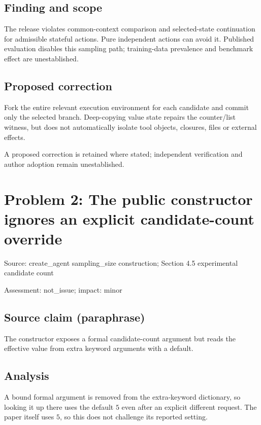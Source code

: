 \documentclass[11pt]{article}
\begin{document}
\subsection*{Finding and scope}

The release violates common-context comparison and selected-state continuation for admissible stateful actions. Pure independent actions can avoid it. Published evaluation disables this sampling path; training-data prevalence and benchmark effect are unestablished.

\subsection*{Proposed correction}

Fork the entire relevant execution environment for each candidate and commit only the selected branch. Deep-copying value state repairs the counter/list witness, but does not automatically isolate tool objects, closures, files or external effects.

A proposed correction is retained where stated; independent verification and author adoption remain unestablished.

\section*{Problem 2: The public constructor ignores an explicit candidate-count override}

Source: create\_agent sampling\_size construction; Section 4.5 experimental candidate count

Assessment: not\_issue; impact: minor

\subsection*{Source claim (paraphrase)}

The constructor exposes a formal candidate-count argument but reads the effective value from extra keyword arguments with a default.

\subsection*{Analysis}

A bound formal argument is removed from the extra-keyword dictionary, so looking it up there uses the default \(5\) even after an explicit different request. The paper itself uses \(5\), so this does not challenge its reported setting.
\end{document}
